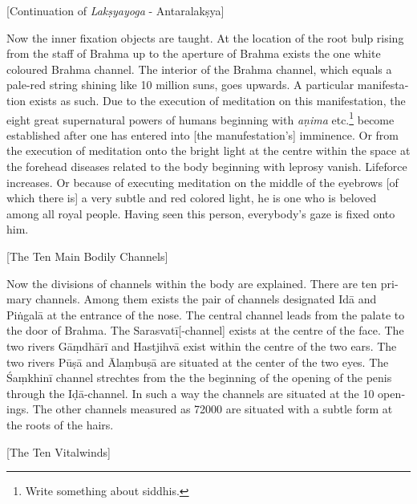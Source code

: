 \begin{otherlanguage}{english}
\begin{tlate}
     \bigskip
        \centerline{\textrm{\small{[Continuation of \textit{Lakṣyayoga} - Antaralakṣya]}}}
          \bigskip
Now the inner fixation objects are taught. At the location of the root bulp rising from the staff of Brahma up to the aperture of Brahma exists the one white coloured Brahma channel. The interior of the Brahma channel, which equals a pale-red string shining like 10 million suns, goes upwards. A particular manifestation exists as such. Due to the execution of meditation on this manifestation, the eight great supernatural powers of humans beginning with \textit{aṇima} etc.\footnote{Write something about siddhis.} become established after one has entered into [the manufestation's] imminence. Or from the execution of meditation onto the bright light at the centre within the space at the forehead diseases related to the body beginning with leprosy vanish. Lifeforce increases. Or because of executing meditation on the middle of the eyebrows [of which there is] a very subtle and red colored light, he is one who is beloved among all royal people. Having seen this person, everybody's gaze is fixed onto him.
\end{tlate}
\begin{tlate}
 \bigskip
 \centerline{\textrm{\small{[The Ten Main Bodily Channels]}}}
 \bigskip
 Now the divisions of channels within the body are explained. There are ten primary channels. Among them exists the pair of channels designated Idā and Piṅgalā at the entrance of the nose. The central channel leads from the palate to the door of Brahma. The Sarasvatī[-channel] exists at the centre of the face. The two rivers Gāṃdhārī and Hastjihvā exist within the centre of the two ears. The two rivers Pūṣā and Ālaṃbuṣā are situated at the center of the two eyes. The Śaṃkhinī channel strechtes from the the beginning of the opening of the penis through the Iḍā-channel. In such a way the channels are situated at the 10 openings. The other channels measured as 72000 are situated with a subtle form at the roots of the hairs.
\end{tlate}
 \begin{tlate}
\bigskip
 \centerline{\textrm{\small{[The Ten Vitalwinds]}}}
 \bigskip

\end{tlate}
\end{otherlanguage}
